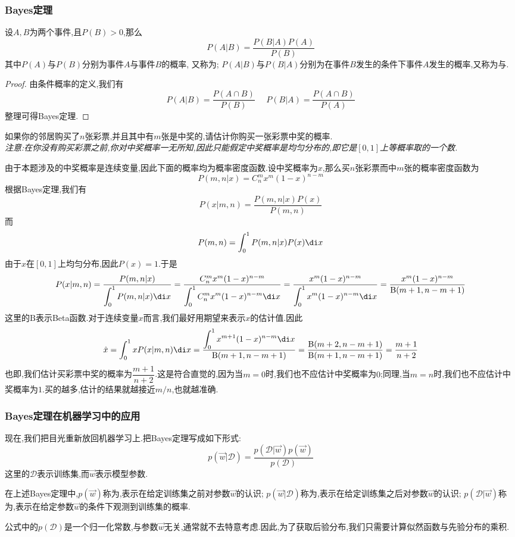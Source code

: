 \documentclass{ctexart}
\begin{document}
\subsubsection{Bayes定理}
\begin{theorem}[Bayes定理]
    设$A,B$为两个事件,且$P(B)>0$,那么
    \[P(A|B)=\dfrac{P(B|A)P(A)}{P(B)}\]
    其中$P(A)$与$P(B)$分别为事件$A$与事件$B$的概率, 又称为; $P(A|B)$与$P(B|A)$分别为在事件$B$发生的条件下事件$A$发生的概率,又称为与.
\end{theorem}
\begin{proof}
    由条件概率的定义,我们有
    \[P(A|B)=\dfrac{P(A\cap B)}{P(B)}\ \ \ \ \ \ P(B|A)=\dfrac{P(A\cap B)}{P(A)}\]
    整理可得Bayes定理.
\end{proof}
\begin{problem}
    如果你的邻居购买了$n$张彩票,并且其中有$m$张是中奖的,请估计你购买一张彩票中奖的概率.\\
    \textit{注意:在你没有购买彩票之前,你对中奖概率一无所知,因此只能假定中奖概率是均匀分布的,即它是$[0,1]$上等概率取的一个数.}
\end{problem}
\begin{solution}
    由于本题涉及的中奖概率是连续变量,因此下面的概率均为概率密度函数.设中奖概率为$x$,那么买$n$张彩票而中$m$张的概率密度函数为
    \[P(m,n|x)=C_n^mx^m(1-x)^{n-m}\]
    根据Bayes定理,我们有
    \[P(x|m,n)=\dfrac{P(m,n|x)P(x)}{P(m,n)}\]
    而
    \[P(m,n)=\int_{0}^{1}P(m,n|x)P(x)\di x\]
    由于$x$在$[0,1]$上均匀分布,因此$P(x)=1$.于是
    \[P(x|m,n)=\dfrac{P(m,n|x)}{\displaystyle\int_0^1P(m,n|x)\di x}=\dfrac{C_n^mx^m(1-x)^{n-m}}{\displaystyle\int_0^1C_n^mx^m(1-x)^{n-m}\di x}=\dfrac{x^m(1-x)^{n-m}}{\displaystyle\int_0^1x^m(1-x)^{n-m}\di x}
    =\dfrac{x^m(1-x)^{n-m}}{\text{B}(m+1,n-m+1)}\]
    这里的$\text{B}$表示Beta函数.对于连续变量$x$而言,我们最好用期望来表示$x$的估计值.因此
    \[\hat{x}=\int_0^1xP(x|m,n)\di x=\dfrac{\displaystyle\int_0^1x^{m+1}(1-x)^{n-m}\di x}{\text{B}(m+1,n-m+1)}=\dfrac{\text{B}(m+2,n-m+1)}{\text{B}(m+1,n-m+1)}=\dfrac{m+1}{n+2}\]
    也即,我们估计买彩票中奖的概率为$\dfrac{m+1}{n+2}$.这是符合直觉的,因为当$m=0$时,我们也不应估计中奖概率为$0$;同理,当$m=n$时,我们也不应估计中奖概率为$1$.买的越多,估计的结果就越接近$m/n$,也就越准确.
\end{solution}
\subsubsection{Bayes定理在机器学习中的应用}
现在,我们把目光重新放回机器学习上.把Bayes定理写成如下形式:
\[p(\vec{w}|\mathcal{D})=\dfrac{p(\mathcal{D}|\vec{w})p(\vec{w})}{p(\mathcal{D})}\]
这里的$\mathcal{D}$表示训练集,而$\vec{w}$表示模型参数.
\begin{definition}
    在上述Bayes定理中,$p(\vec{w})$称为,表示在给定训练集之前对参数$\vec{w}$的认识; $p(\vec{w}|\mathcal{D})$称为,表示在给定训练集之后对参数$\vec{w}$的认识; $p(\mathcal{D}|\vec{w})$称为,表示在给定参数$\vec{w}$的条件下观测到训练集的概率.
\end{definition}
公式中的$p(\mathcal{D})$是一个归一化常数,与参数$\vec{w}$无关,通常就不去特意考虑.因此,为了获取后验分布,我们只需要计算似然函数与先验分布的乘积.
\end{document}
